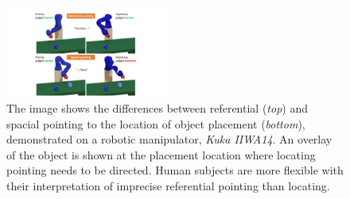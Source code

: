 

\begin{figure}[t]
    \centering
    \includegraphics[width=0.48\textwidth]{spatial-referential.pdf}
    \caption{The image shows the differences between referential (\textit{top}) and spacial pointing to the location of object placement (\textit{bottom}), demonstrated on a robotic manipulator, \textit{Kuka IIWA14}. An overlay of the object is shown at the placement location where locating pointing needs to be directed.  Human subjects are more flexible with their interpretation of imprecise referential pointing than locating.}
    \label{fig:spatial}
\end{figure}


